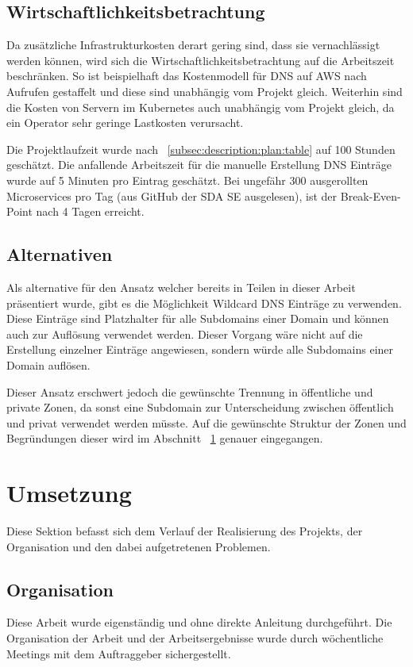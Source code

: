 \subsection{Wirtschaftlichkeitsbetrachtung}
\label{subsec:description:wirtschaftlichkeitsbetrachtung}
Da zusätzliche Infrastrukturkosten derart gering sind, dass sie vernachlässigt werden können, wird sich die Wirtschaftlichkeitsbetrachtung auf die Arbeitszeit beschränken.
So ist beispielhaft das Kostenmodell für DNS auf AWS nach Aufrufen gestaffelt und diese sind unabhängig vom Projekt gleich.
Weiterhin sind die Kosten von Servern im Kubernetes auch unabhängig vom Projekt gleich, da ein Operator sehr geringe Lastkosten verursacht.

Die Projektlaufzeit wurde nach ~\ref{subsec:description:plan:table} auf 100 Stunden geschätzt.
Die anfallende Arbeitszeit für die manuelle Erstellung DNS Einträge wurde auf 5 Minuten pro Eintrag geschätzt.
Bei ungefähr 300 ausgerollten Microservices pro Tag (aus GitHub der SDA SE ausgelesen), ist der Break-Even-Point nach 4 Tagen erreicht.

\subsection{Alternativen}
\label{subsec:description:alternativen}
Als alternative für den Ansatz welcher bereits in Teilen in dieser Arbeit präsentiert wurde, gibt es die Möglichkeit Wildcard DNS Einträge zu verwenden.
Diese Einträge sind Platzhalter für alle Subdomains einer Domain und können auch zur Auflösung verwendet werden.
Dieser Vorgang wäre nicht auf die Erstellung einzelner Einträge angewiesen, sondern würde alle Subdomains einer Domain auflösen.
\medskip

Dieser Ansatz erschwert jedoch die gewünschte Trennung in öffentliche und private Zonen, da sonst eine Subdomain zur Unterscheidung zwischen öffentlich und privat verwendet werden müsste.
Auf die gewünschte Struktur der Zonen und Begründungen dieser wird im Abschnitt ~\ref{sec:description:umsetzung} genauer eingegangen.

\section{Umsetzung}
\label{sec:description:umsetzung}
Diese Sektion befasst sich dem Verlauf der Realisierung des Projekts, der Organisation und den dabei aufgetretenen Problemen.

\subsection{Organisation}
\label{subsec:description:Organisation}
Diese Arbeit wurde eigenständig und ohne direkte Anleitung durchgeführt.
Die Organisation der Arbeit und der Arbeitsergebnisse wurde durch wöchentliche Meetings mit dem Auftraggeber sichergestellt.

